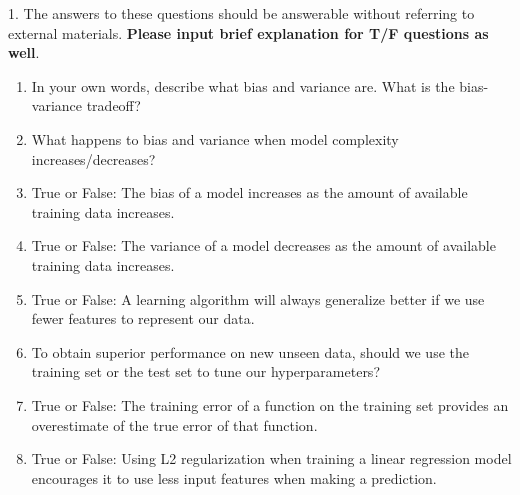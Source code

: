 1. The answers to these questions should be answerable without referring
to external materials. \textbf{Please input brief explanation for T/F questions as well}.
\begin{enumerate}
    \item{} In your own words, describe what bias and variance are. What is the bias-variance tradeoff?
		
    \item {} What happens to bias and variance when model complexity increases/decreases? 
	
    \item {} True or False: The bias of a model increases as the amount of available training data increases.
	
    \item {} True or False: The variance of a model decreases as the amount of available training data increases.
	
    \item {} True or False: A learning algorithm will always generalize better if we use fewer features to represent our data.
	
    \item {} To obtain superior performance on new unseen data, should we use the training set or the test set to tune our hyperparameters?
	
    \item {} True or False: The training error of a function on the training set provides an overestimate of the true error of that function.
	
    \item {} True or False: Using L2 regularization when training a linear regression model encourages it to use less input features when making a prediction.
	
\end{enumerate}
